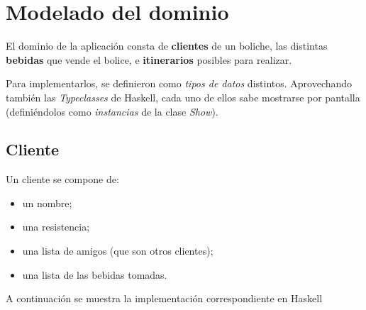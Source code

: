 







\clearpage
\tableofcontents
\clearpage 

\lstset{style=haskell}

\section{Modelado del dominio}

El dominio de la aplicación consta de \textbf{clientes} de un boliche, las distintas \textbf{bebidas} que vende el bolice, e \textbf{itinerarios} posibles para realizar.   

Para implementarlos, se definieron como \emph{tipos de datos} distintos. Aprovechando también las \emph{Typeclasses} de Haskell, cada uno de ellos sabe mostrarse por pantalla (definiéndolos como \emph{instancias} de la clase \emph{Show}). 

\subsection{Cliente}

Un cliente se compone de:
\begin{itemize}
    \item un nombre;
    \item una resistencia;
    \item una lista de amigos (que son otros clientes);
    \item una lista de las bebidas tomadas.
\end{itemize}

A continuación se muestra la implementación correspondiente en Haskell

